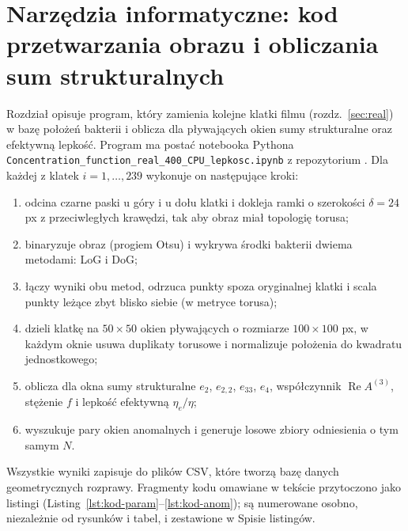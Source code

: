 \documentclass[12pt,a4paper,twoside,openright]{report}
\theoremstyle{definition}
\theoremstyle{remark}
\renewcommand{\Re}{\operatorname{Re}}
\begin{document}
{
\chapter{Narzędzia informatyczne: kod przetwarzania obrazu i obliczania sum strukturalnych}\label{sec:kod}

Rozdział opisuje program, który zamienia kolejne klatki filmu (rozdz.~\ref{sec:real}) w bazę położeń bakterii i oblicza dla pływających okien sumy strukturalne oraz efektywną lepkość. Program ma postać notebooka Pythona \texttt{Concentration\_function\_real\_400\_CPU\_lepkosc.ipynb} z repozytorium \cite{ligocki_doktorat_github}. Dla każdej z klatek $i=1,\dots,239$ wykonuje on następujące kroki:
\begin{enumerate}[nosep]
\item odcina czarne paski u góry i u dołu klatki i dokleja ramki o szerokości $\delta=24$ px z przeciwległych krawędzi, tak aby obraz miał topologię torusa;
\item binaryzuje obraz (progiem Otsu) i wykrywa środki bakterii dwiema metodami: LoG i DoG;
\item łączy wyniki obu metod, odrzuca punkty spoza oryginalnej klatki i scala punkty leżące zbyt blisko siebie (w metryce torusa);
\item dzieli klatkę na $50\times50$ okien pływających o rozmiarze $100\times100$ px, w każdym oknie usuwa duplikaty torusowe i normalizuje położenia do kwadratu jednostkowego;
\item oblicza dla okna sumy strukturalne $e_2$, $e_{2,2}$, $e_{33}$, $e_4$, współczynnik $\Re A^{(3)}$, stężenie $f$ i lepkość efektywną $\eta_e/\eta$;
\item wyszukuje pary okien anomalnych i generuje losowe zbiory odniesienia o tym samym $N$.
\end{enumerate}
Wszystkie wyniki zapisuje do plików CSV, które tworzą bazę danych geometrycznych rozprawy. Fragmenty kodu omawiane w tekście przytoczono jako listingi (Listing~\ref{lst:kod-param}--\ref{lst:kod-anom}); są numerowane osobno, niezależnie od rysunków i tabel, i zestawione w Spisie listingów.

}
\end{document}
